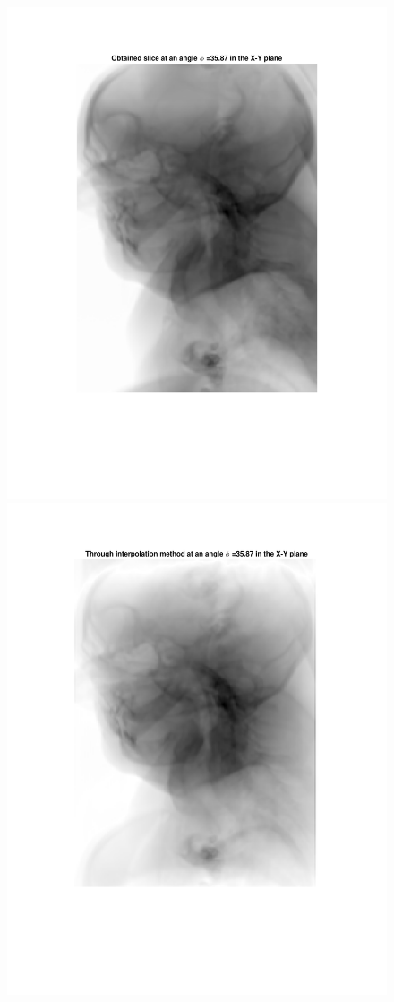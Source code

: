 \documentclass{UCF_ETD}
\begin{document}
\begin{figure}[H]   
\begin{center}
\includegraphics[scale=0.5]{FVR/ExactSlice}
\includegraphics[scale=0.5]{FVR/InterpolatedSlice}

\end{center}
\end{figure}
\end{document}
